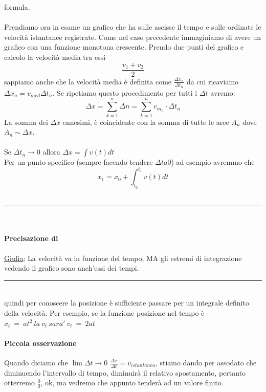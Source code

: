 \documentclass[12pt, a4paper, openany, oneside]{book}
\begin{document}
formula. 
\\ \\ 
Prendiamo ora in esame un grafico che ha sulle ascisse il tempo e sulle ordinate 
le velocità istantanee registrate. Come nel caso precedente immaginiamo di avere 
un grafico con una funzione monotona crescente. Prendo due punti del grafico e
calcolo la velocità media tra essi 
\[\frac{v_{1} + v_{2}}{2}\]
sappiamo anche che la velocità media è definita come $\frac{\Delta x_{n}}{\Delta t_{n}}$
da cui ricaviamo $\Delta x_{n} = v_{med} \Delta t_{n}$.
Se ripetiamo questo procedimento per tutti i $\Delta t$ avremo:
\[\Delta x = \sum_{k=1}^n \Delta n = \sum_{k=1}^n v_{m_{n}} \cdot \Delta t_{n}\]
La somma dei $\Delta x$ ennesimi, è coincidente con la somma di tutte le aree
$A_{n}$ dove $A_{n} \sim \Delta x$. \\ \\
Se $\Delta t_{n} \to 0$ allora $\Delta x = \int v(t) dt$ \\
Per un punto specifico (sempre facendo tendere $\Delta t a 0$) ad esempio avremmo che 
\[x_{1} = x_{0} + \int_{t_{0}}^{t_{1}} v(t) dt \]
\\
{\color{black} \rule{\linewidth}{0.mm} }
\\
\paragraph{Precisazione di } \href{https://github.com/LiaBell47}{Giulia}:
La velocità va in funzione del tempo, MA gli estremi di integrazione vedendo il
grafico sono anch'essi dei tempi.
\\
{\color{black} \rule{\linewidth}{0.mm} }
\\
quindi per conoscere la posizione è sufficiente passare per un integrale definito della velocità.
Per esempio, se la funzione posizione nel tempo è $x_{t} ~ = ~ at^2 ~ la ~ v_{t}
~ sara' ~ v_{t} ~ =~  2at$
\paragraph{Piccola osservazione} Quando diciamo che $\lim{\Delta t \to 0}$ 
$\frac{\Delta x}{\Delta t} = v_{istantanea}$, stiamo dando per assodato che
diminuendo l'intervallo di tempo, diminuirà il relativo spostamento, pertanto
otterremo $\frac{0}{0}$, ok, ma vedremo che appunto tenderà ad un valore finito.
\end{document}
